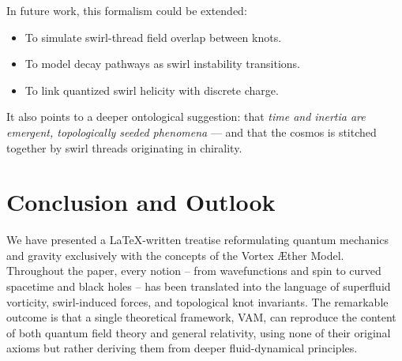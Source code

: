 \documentclass[a4paper,12pt]{article}
\begin{document}
    In future work, this formalism could be extended:
    \begin{itemize}
        \item To simulate swirl-thread field overlap between knots.
        \item To model decay pathways as swirl instability transitions.
        \item To link quantized swirl helicity with discrete charge.
    \end{itemize}

    It also points to a deeper ontological suggestion: that \textit{time and inertia are emergent, topologically seeded phenomena} — and that the cosmos is stitched together by swirl threads originating in chirality.


\section{Conclusion and Outlook}
    We have presented a LaTeX-written treatise reformulating quantum mechanics and gravity exclusively with the concepts of the Vortex Æther Model. Throughout the paper, every notion – from wavefunctions and spin to curved spacetime and black holes – has been translated into the language of superfluid vorticity, swirl-induced forces, and topological knot invariants. The remarkable outcome is that a single theoretical framework, VAM, can reproduce the content of both quantum field theory and general relativity, using none of their original axioms but rather deriving them from deeper fluid-dynamical principles.
\end{document}
